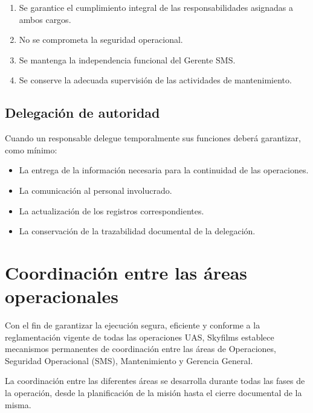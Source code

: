 \begin{enumerate}[label=\alph*)]

\item Se garantice el cumplimiento integral de las responsabilidades asignadas a ambos cargos.

\item No se comprometa la seguridad operacional.

\item Se mantenga la independencia funcional del Gerente SMS.

\item Se conserve la adecuada supervisión de las actividades de mantenimiento.

\end{enumerate}


\subsection*{Delegación de autoridad}

Cuando un responsable delegue temporalmente sus funciones deberá garantizar, como mínimo:

\begin{itemize}

\item La entrega de la información necesaria para la continuidad de las operaciones.

\item La comunicación al personal involucrado.

\item La actualización de los registros correspondientes.

\item La conservación de la trazabilidad documental de la delegación.

\end{itemize}


\section{Coordinación entre las áreas operacionales}

Con el fin de garantizar la ejecución segura, eficiente y conforme a la reglamentación vigente de todas las operaciones UAS, Skyfilms establece mecanismos permanentes de coordinación entre las áreas de Operaciones, Seguridad Operacional (SMS), Mantenimiento y Gerencia General.

La coordinación entre las diferentes áreas se desarrolla durante todas las fases de la operación, desde la planificación de la misión hasta el cierre documental de la misma.



